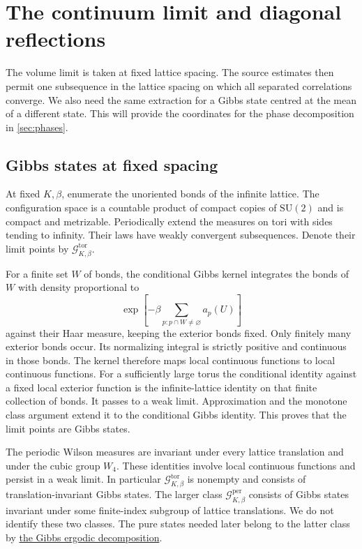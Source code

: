 \documentclass[11pt,letterpaper,reqno]{amsart}
\theoremstyle{definition}
\theoremstyle{remark}
\newcommand{\SU}{\mathrm{SU}}
\begin{document}
\section{The continuum limit and diagonal reflections}\label{sec:limits}

The volume limit is taken at fixed lattice spacing. The source estimates
then permit one subsequence in the lattice spacing on which all
separated correlations converge. We also need the same extraction for
a Gibbs state centred at the mean of a different state. This will
provide the coordinates for the phase decomposition in
\cref{sec:phases}.

\subsection{Gibbs states at fixed spacing}

At fixed $K,\beta$, enumerate the unoriented bonds of the infinite
lattice. The configuration space is a countable product of compact
copies of $\SU(2)$ and is compact and metrizable. Periodically extend
the measures on tori with sides tending to infinity. Their laws have
weakly convergent subsequences. Denote their limit points by
$\mathcal G^{\mathrm{tor}}_{K,\beta}$.

For a finite set $W$ of bonds, the conditional Gibbs kernel integrates
the bonds of $W$ with density proportional to
\[
 \exp\left[-\beta\sum_{p:p\cap W\ne\varnothing}a_p(U)\right]
\]
against their Haar measure, keeping the exterior bonds fixed. Only
finitely many exterior bonds occur. Its normalizing integral is strictly
positive and continuous in those bonds. The kernel therefore maps local
continuous functions to local continuous functions. For a sufficiently
large torus the conditional identity against a fixed local exterior
function is the infinite-lattice identity on that finite collection of
bonds. It passes to a weak limit. Approximation and the monotone class
argument extend it to the conditional Gibbs identity. This proves that
the limit points are Gibbs states.

The periodic Wilson measures are invariant under every lattice
translation and under the cubic group $W_4$. These identities involve
local continuous functions and persist in a weak limit. In particular
$\mathcal G^{\mathrm{tor}}_{K,\beta}$ is nonempty and consists of
translation-invariant Gibbs states. The larger class
$\mathcal G^{\mathrm{per}}_{K,\beta}$ consists of Gibbs states
invariant under some finite-index subgroup of lattice translations.
We do not identify these two classes. The pure states needed later
belong to the latter class by
\hyperref[hyp:gibbs-decomposition]{the Gibbs ergodic decomposition}.
\end{document}
